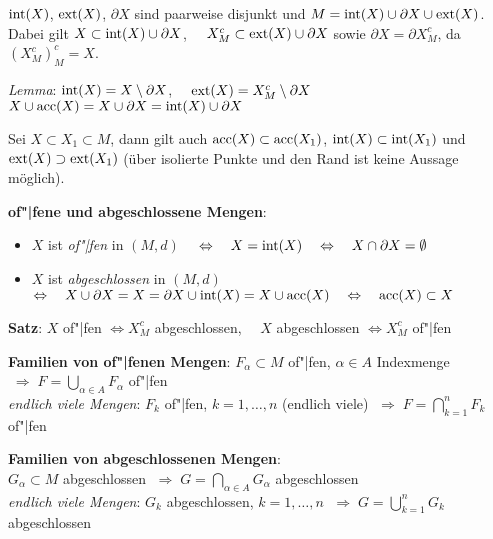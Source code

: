 \linie

$\operatorname{int}(X)$, $\operatorname{ext}(X)$, $\partial X$ sind paarweise disjunkt und
$M = \operatorname{int}(X) \cup \partial X \cup \operatorname{ext}(X)$. \\
Dabei gilt $X \subset \operatorname{int}(X) \cup \partial X$,
$\quad X_M^c \subset \operatorname{ext}(X) \cup \partial X$ \quad sowie
$\partial X = \partial X_M^c$, da $(X_M^c)_M^c = X$.

\emph{Lemma}: $\operatorname{int}(X) = X \setminus \partial X$,
$\quad\operatorname{ext}(X) = X_M^c \setminus \partial X$ \\
$X \cup \operatorname{acc}(X) = X \cup \partial X = \operatorname{int}(X) \cup \partial X$

Sei $X \subset X_1 \subset M$, dann gilt auch $\operatorname{acc}(X) \subset \operatorname{acc}(X_1)$,
$\operatorname{int}(X) \subset \operatorname{int}(X_1)$ und
$\operatorname{ext}(X) \supset \operatorname{ext}(X_1)$
(über isolierte Punkte und den Rand ist keine Aussage möglich).

\linie
\pagebreak

\textbf{of"|fene und abgeschlossene Mengen}:

\begin{itemize}
    \item $X$ ist \emph{of"|fen} in $(M,d)$
    $\quad\Leftrightarrow\quad X = \operatorname{int}(X) \quad\Leftrightarrow\quad
    X \cap \partial X = \emptyset$

    \item $X$ ist \emph{abgeschlossen} in $(M,d)$ \\
    $\Leftrightarrow\quad X \cup \partial X = X =
    \partial X \cup \operatorname{int}(X) = X \cup \operatorname{acc}(X) \quad\Leftrightarrow\quad
    \operatorname{acc}(X) \subset X$
\end{itemize}

\textbf{Satz}: $X$ of"|fen $\Leftrightarrow X_M^c$ abgeschlossen,
$\quad X$ abgeschlossen $\Leftrightarrow X_M^c$ of"|fen

\textbf{Familien von of"|fenen Mengen}:
$F_\alpha \subset M$ of"|fen, $\alpha \in A$ Indexmenge
$\;\Rightarrow\; F = \bigcup_{\alpha \in A} F_\alpha$ of"|fen \\
\emph{endlich viele Mengen}:
$F_k$ of"|fen, $k = 1, \ldots, n$ (endlich viele)
$\;\Rightarrow\; F = \bigcap_{k=1}^n F_k$ of"|fen

\textbf{Familien von abgeschlossenen Mengen}: \\
$G_\alpha \subset M$ abgeschlossen
$\;\Rightarrow\; G = \bigcap_{\alpha \in A} G_\alpha$ abgeschlossen \\
\emph{endlich viele Mengen}:
$G_k$ abgeschlossen, $k = 1, \ldots, n$
$\;\Rightarrow\; G = \bigcup_{k=1}^n G_k$ abgeschlossen

